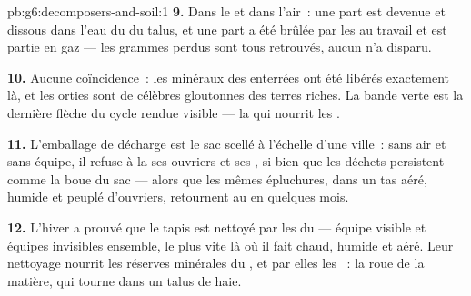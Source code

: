 \begin{solution}{pb:g6:decomposers-and-soil:1}
\textbf{9.} Dans le  et dans l'air~: une part est devenue 
et  dissous dans l'eau du  du talus, et une part a
été brûlée par les  au travail et est partie en gaz ---
les grammes perdus sont tous retrouvés, aucun n'a disparu.

\textbf{10.} Aucune coïncidence~: les minéraux des 
enterrées ont été libérés exactement là, et les orties sont de
célèbres gloutonnes des terres riches. La bande verte est la
dernière flèche du cycle rendue visible --- la  qui
nourrit les .

\textbf{11.} L'emballage de décharge est le sac scellé à l'échelle
d'une ville~: sans air et sans équipe, il refuse à la 
ses ouvriers et ses , si bien que les déchets persistent
comme la boue du sac --- alors que les mêmes épluchures, dans un tas
aéré, humide et peuplé d'ouvriers, retournent au  en quelques
mois.

\textbf{12.} L'hiver a prouvé que le tapis est nettoyé par les
 du  --- équipe visible et équipes invisibles
ensemble, le plus vite là où il fait chaud, humide et aéré. Leur
nettoyage nourrit les réserves minérales du , et par elles les
~: la roue de la matière, qui tourne dans un talus de
haie.
\end{solution}
